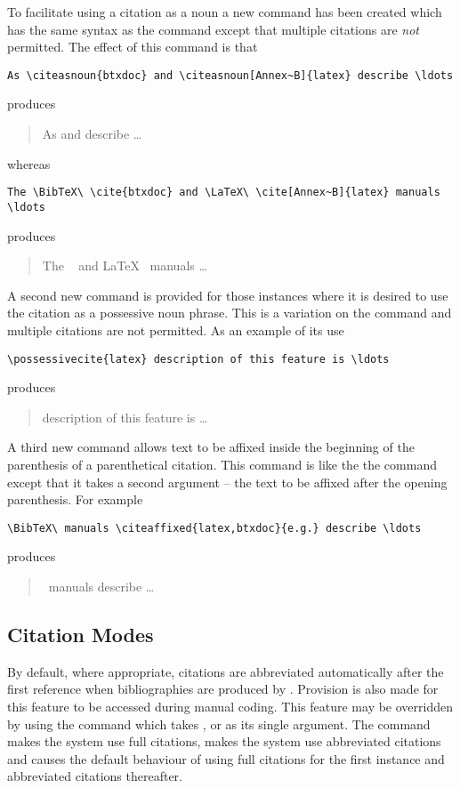 To facilitate using a citation as a noun a new command
 has been created which has the same syntax as the
 command except that multiple citations are {\em not}
permitted.
The effect of this command is that
\begin{verbatim}
As \citeasnoun{btxdoc} and \citeasnoun[Annex~B]{latex} describe \ldots
\end{verbatim}
produces
\begin{quote}
As  and  describe \ldots
\end{quote}
whereas
\begin{verbatim}
The \BibTeX\ \cite{btxdoc} and \LaTeX\ \cite[Annex~B]{latex} manuals \ldots
\end{verbatim}
produces
\begin{quote}
The \BibTeX\ \cite{btxdoc} and \LaTeX\ \cite[Annex~B]{latex} manuals \ldots
\end{quote}
A second new command  is provided for those
instances where it is desired to use the citation as a possessive noun phrase.
This is a variation on the  command and
multiple citations are not permitted.
As an example of its use
\begin{verbatim}
\possessivecite{latex} description of this feature is \ldots
\end{verbatim}
produces
\begin{quote}
 description of this feature is \ldots
\end{quote}
A third new command  allows text to be affixed
inside the beginning of the parenthesis of a parenthetical citation.
This command is like the the  command except that it
takes a second argument -- the text to be affixed after the opening 
parenthesis.
For example
\begin{verbatim}
\BibTeX\ manuals \citeaffixed{latex,btxdoc}{e.g.} describe \ldots
\end{verbatim}
produces
\begin{quote}
\BibTeX\ manuals  describe \ldots
\end{quote}

\subsection{Citation Modes}

By default,
where appropriate, citations are abbreviated automatically after the first
reference when bibliographies are produced by \BibTeX.
Provision is also made for this feature to be accessed during manual coding.
This feature may be overridden by using the 
command which takes ,  or  as its single
argument.
The command  makes the system use
full citations,  makes the system use
abbreviated citations and  causes
the default behaviour of using full citations for the first instance and
abbreviated citations thereafter.

